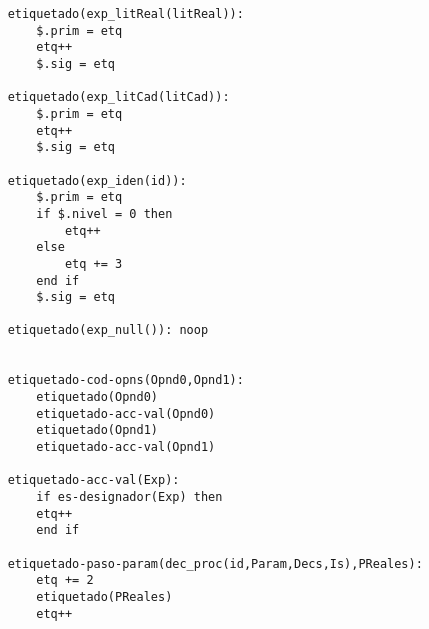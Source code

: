 \begin{lstlisting}
    etiquetado(exp_litReal(litReal)):
        $.prim = etq
        etq++
        $.sig = etq

    etiquetado(exp_litCad(litCad)):
        $.prim = etq
        etq++
        $.sig = etq

    etiquetado(exp_iden(id)):
        $.prim = etq
        if $.nivel = 0 then
            etq++
        else
            etq += 3
        end if
        $.sig = etq

    etiquetado(exp_null()): noop


    etiquetado-cod-opns(Opnd0,Opnd1):
        etiquetado(Opnd0)
        etiquetado-acc-val(Opnd0)
        etiquetado(Opnd1)
        etiquetado-acc-val(Opnd1)

    etiquetado-acc-val(Exp):
        if es-designador(Exp) then
        etq++
        end if

    etiquetado-paso-param(dec_proc(id,Param,Decs,Is),PReales):
        etq += 2
        etiquetado(PReales)
        etq++

\end{lstlisting}

